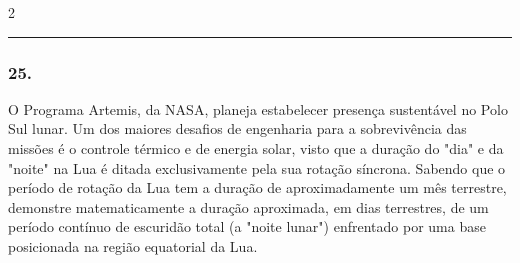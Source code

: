 \documentclass[twoside, 10pt, a4paper]{article}
\newlength{\espacoPreQuestao}
\newlength{\espacoQuestao}
\begin{document}
\begin{multicols*}{2}
\noindent\textcolor{CorLinha}{\rule{\linewidth}{0.5pt}} 
\par\vspace{\espacoPreQuestao}
\subsubsection*{25.} O Programa Artemis, da NASA, planeja estabelecer presença sustentável no Polo Sul lunar. Um dos maiores desafios de engenharia para a sobrevivência das missões é o controle térmico e de energia solar, visto que a duração do "dia" e da "noite" na Lua é ditada exclusivamente pela sua rotação síncrona. Sabendo que o período de rotação da Lua tem a duração de aproximadamente um mês terrestre, demonstre matematicamente a duração aproximada, em dias terrestres, de um período contínuo de escuridão total (a "noite lunar") enfrentado por uma base posicionada na região equatorial da Lua.
\par\vspace{\espacoQuestao}

\end{multicols*}
\end{document}
